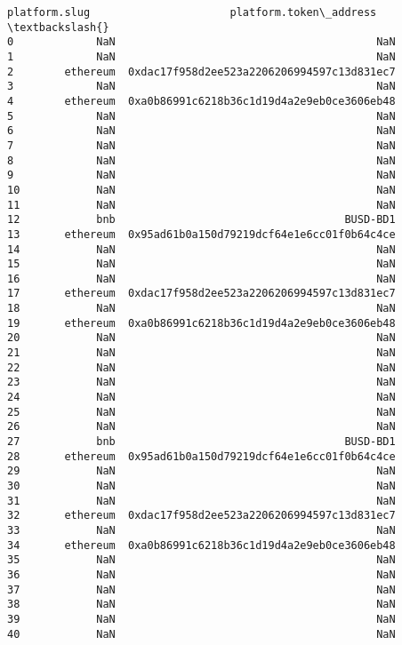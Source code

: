 \documentclass[11pt]{article}
\begin{document}
\begin{tcolorbox}[breakable, size=fbox, boxrule=.5pt, pad at break*=1mm, opacityfill=0]
\begin{Verbatim}[commandchars=\\\{\}]
    platform.slug                      platform.token\_address  \textbackslash{}
0             NaN                                         NaN
1             NaN                                         NaN
2        ethereum  0xdac17f958d2ee523a2206206994597c13d831ec7
3             NaN                                         NaN
4        ethereum  0xa0b86991c6218b36c1d19d4a2e9eb0ce3606eb48
5             NaN                                         NaN
6             NaN                                         NaN
7             NaN                                         NaN
8             NaN                                         NaN
9             NaN                                         NaN
10            NaN                                         NaN
11            NaN                                         NaN
12            bnb                                    BUSD-BD1
13       ethereum  0x95ad61b0a150d79219dcf64e1e6cc01f0b64c4ce
14            NaN                                         NaN
15            NaN                                         NaN
16            NaN                                         NaN
17       ethereum  0xdac17f958d2ee523a2206206994597c13d831ec7
18            NaN                                         NaN
19       ethereum  0xa0b86991c6218b36c1d19d4a2e9eb0ce3606eb48
20            NaN                                         NaN
21            NaN                                         NaN
22            NaN                                         NaN
23            NaN                                         NaN
24            NaN                                         NaN
25            NaN                                         NaN
26            NaN                                         NaN
27            bnb                                    BUSD-BD1
28       ethereum  0x95ad61b0a150d79219dcf64e1e6cc01f0b64c4ce
29            NaN                                         NaN
30            NaN                                         NaN
31            NaN                                         NaN
32       ethereum  0xdac17f958d2ee523a2206206994597c13d831ec7
33            NaN                                         NaN
34       ethereum  0xa0b86991c6218b36c1d19d4a2e9eb0ce3606eb48
35            NaN                                         NaN
36            NaN                                         NaN
37            NaN                                         NaN
38            NaN                                         NaN
39            NaN                                         NaN
40            NaN                                         NaN

\end{Verbatim}
\end{tcolorbox}
\end{document}
